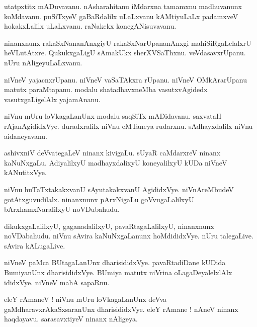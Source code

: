 \documentclass{article}
\begin{document}
\begin{mn}%
utatpxtitx mADuvavanu. nAsharahitanu iMdarxna tamamxnu madhuvanunx koMdavanu. puSiTxyeV gaBaRdalilx 
uLaLxvanu kAMtiyuLaLx padamxveV hokakxLalilx uLaLxvanu. raNakekx konegANisuvavanu.
\end{mn}

\begin{mn}%
ninanxnunx rakaSxNananAnxgiyU rakaSxNarUpananAnxgi mahiSiRgaLelalxrU heVLutAtxre. QukukxgaLigU 
sAmakUkx sherXVSaThxnu. veVdasavxrUpanu. nUru nAligeyuLaLxvanu.
\end{mn}

\begin{mn}%
niVneV yajacnxrUpanu. niVneV vaSaTAkxra rUpanu. niVneV OMkArarUpanu matutx paraMtapanu. modalu 
shatadhavxneMba vasutxvAgidedx vasutxgaLigelAlx yajamAnanu.
\end{mn}

\begin{mn}%
niVnu mUru loVkagaLanUnx modalu saqSiTx mADidavanu. saxvataH rAjanAgididxVye. duradxralilx niVnu 
eMTaneya rudarxnu. sAdhayxdalilx niVnu aidaneyavanu.
\end{mn}

\begin{mn}%
ashivxniV deVvategaLeV ninanx kivigaLu. sUyaR caMdarxreV ninanx kaNuNxgaLu. AdiyalilxyU 
madhayxdalixyU koneyalilxyU kUDa niVneV kANutitxVye.
\end{mn}

\begin{mn}%
niVnu huTaTxtakakxvanU sAyutakakxvanU AgididxVye. niVnAreMbudeV gotAtxguvudilalx. ninanxnunx 
pArxNigaLu goVvugaLalilxyU bArxhamxNaralilxyU noVDubahudu.
\end{mn}

\begin{mn}%
dikukxgaLalilxyU, gaganadalilxyU, pavaRtagaLalilxyU, ninanxnunx noVDabahudu. niVnu sAvira 
kaNuNxgaLanunx hoMdididxVye. nUru talegaLive. sAvira kALugaLive.
\end{mn}

\begin{mn}%
niVneV paMca BUtagaLanUnx dharisididxVye. pavaRtadiDane kUDida BumiyanUnx dharisididxVye. BUmiya 
matutx niVrina oLagaDeyalelxlAlx ididxVye. niVneV mahA sapaRnu.
\end{mn}

\begin{mn}%
eleY rAmaneV ! niVnu mUru loVkagaLanUnx deVva gaMdharavxrAkaSxsaranUnx dharisididxVye. eleY rAmane 
! nAneV ninanx haqdayavu. sarasavxtiyeV ninanx nAligeya.
\end{mn}
\end{document}
